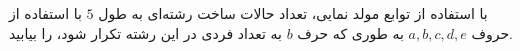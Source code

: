 \EXERCISE
با استفاده از توابع مولد نمایی، تعداد حالات ساخت رشته‌ای به طول 
$5$
با استفاده از حروف 
$a, b, c, d, e$
 به طوری که حرف 
$b$
  به تعداد فردی در این رشته تکرار شود، را بیابید.